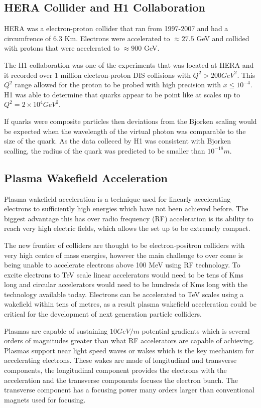 \documentclass[journal, a4paper,11pt]{IEEEtran}
\begin{document}
\subsection*{\textbf{HERA Collider and H1 Collaboration}}

HERA was a electron-proton collider that ran from 1997-2007 and had a circumfrence of 6.3 Km. Electrons were accelerated to $\approx 27.5$ GeV and collided with protons that were accelerated to $\approx 900$ GeV.

The H1 collaboration was one of the experiments that was located at HERA and it recorded over 1 million electron-proton DIS collisions with $Q^2 > 200 GeV^2$. This $Q^2$ range allowed for the proton to be probed with high precision with $x \leq 10^{-4}$. H1 was able to determine that quarks appear to be point like at scales up to $Q^2 = 2 \times 10^4 GeV^2$. 

If quarks were composite particles then deviations from the Bjorken scaling would be expected when the wavelength of the virtual photon was comparable to the size of the quark. As the data colleced by H1 was consistent with Bjorken scalling, the radius of the quark was predicted to be smaller than $10^{-18}m$.

\subsection*{\textbf{Plasma Wakefield Acceleration}}

Plasma wakefield acceleration is a technique used for linearly accelerating electrons to sufficiently high energies which have not been achieved before. The biggest advantage this has over radio frequency (RF) acceleration is its ability to reach very high electric fields, which allows the set up to be extremely compact. 

The new frontier of colliders are thought to be electron-positron colliders with very high centre of mass energies, however the main challenge to over come is being unable to accelerate electrons above 100 MeV using RF technology. To excite electrons to TeV scale linear accelerators would need to be tens of Kms long and circular accelerators would need to be hundreds of Kms long with the technology available today. Electrons can be accelerated to TeV scales using a wakefield within tens of metres, as a result plasma wakefield acceleration could be critical for the development of next generation particle colliders.

Plasmas are capable of sustaining $10 GeV/m$ potential gradients which is several orders of magnitudes greater than what RF accelerators are capable of achieving. Plasmas support near light speed waves or wakes which is the key mechanism for accelerating electrons. These wakes are made of longitudinal and transverse components, the longitudinal component provides the electrons with the acceleration and the transverse components focuses the electron bunch. The transverse component has a focusing power many orders larger than conventional magnets used for focusing.
\end{document}
